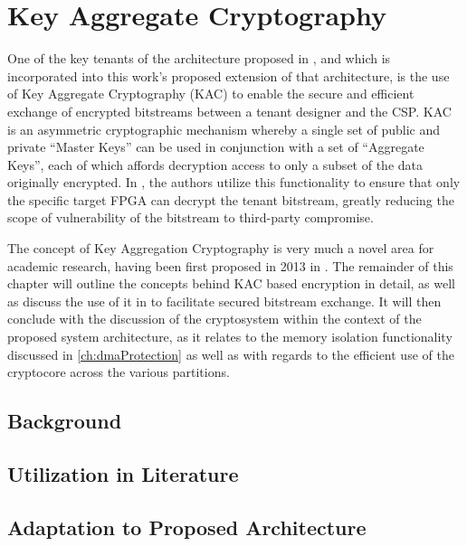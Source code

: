 
\chapter{Key Aggregate Cryptography}\label{ch:keyAggregateCryptography}
One of the key tenants of the architecture proposed in \cite{bag_cryptographically_2020}, and which is incorporated into this work's proposed extension of that architecture, is the use of Key Aggregate Cryptography (KAC) to enable the secure and efficient exchange of encrypted bitstreams between a tenant designer and the CSP. KAC is an asymmetric cryptographic mechanism whereby a single set of public and private ``Master Keys'' can be used in conjunction with a set of ``Aggregate Keys'', each of which affords decryption access to only a subset of the data originally encrypted. In \cite{bag_cryptographically_2020}, the authors utilize this functionality to ensure that only the specific target FPGA can decrypt the tenant bitstream, greatly reducing the scope of vulnerability of the bitstream to third-party compromise.

The concept of Key Aggregation Cryptography is very much a novel area for academic research, having been first proposed in 2013 in \cite{chu_key-aggregate_2014}. The remainder of this chapter will outline the concepts behind KAC based encryption in detail, as well as discuss the use of it in \cite{bag_cryptographically_2020} to facilitate secured bitstream exchange. It will then conclude with the discussion of the cryptosystem within the context of the proposed system architecture, as it relates to the memory isolation functionality discussed in \ref{ch:dmaProtection} as well as with regards to the efficient use of the cryptocore across the various partitions.

\section{Background}\label{sec:KACBackground}

\section{Utilization in Literature}\label{sec:KACLiterature}

\section{Adaptation to Proposed Architecture}\label{sec:KACArchitecture}